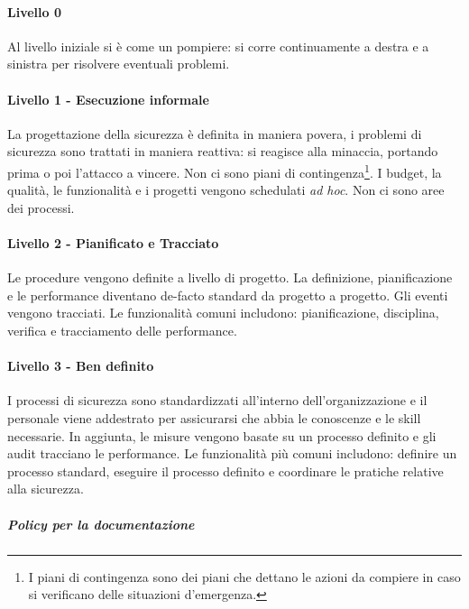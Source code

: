 \paragraph{Livello 0}

Al livello iniziale si è come un pompiere: si corre continuamente a destra e a 
sinistra per risolvere eventuali problemi.

\paragraph{Livello 1 - Esecuzione informale}

La progettazione della sicurezza è definita in maniera povera, i problemi di 
sicurezza sono trattati in maniera reattiva: si reagisce 
alla minaccia, portando prima o poi l'attacco a vincere. Non ci sono piani di 
contingenza\footnote{I piani di contingenza sono dei piani che dettano le azioni 
da compiere in caso si verificano delle situazioni d'emergenza.}. I budget, la 
qualità, le funzionalità e i progetti vengono schedulati \textit{ad hoc}.
Non ci sono aree dei processi.

\paragraph{Livello 2 - Pianificato e Tracciato}

Le procedure vengono definite a livello di progetto. La definizione, pianificazione 
e le performance diventano de-facto standard da progetto a progetto. Gli eventi 
vengono tracciati. Le funzionalità comuni includono: pianificazione, disciplina, 
verifica e tracciamento delle performance.

\paragraph{Livello 3 - Ben definito}

I processi di sicurezza sono standardizzati all'interno dell'organizzazione e il 
personale viene addestrato per assicurarsi che abbia le conoscenze e le skill 
necessarie. In aggiunta, le misure vengono basate su un processo definito e gli 
audit tracciano le performance. Le funzionalità più comuni includono: definire 
un processo standard, eseguire il processo definito e coordinare le pratiche 
relative alla sicurezza.

\subparagraph*{Policy per la documentazione}

